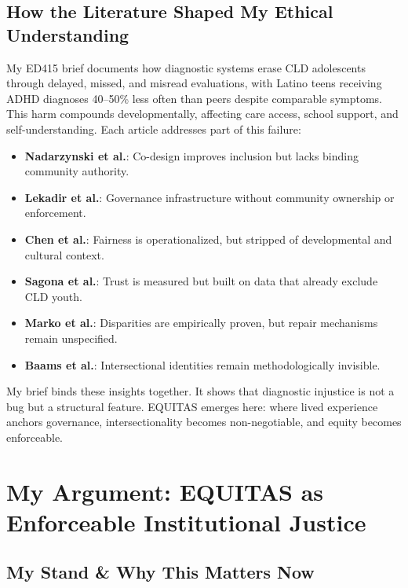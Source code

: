 \documentclass[12pt,a4paper]{article}
\begin{document}
\subsection{How the Literature Shaped My Ethical Understanding}
My ED415 brief documents how diagnostic systems erase CLD adolescents through delayed, missed, and misread evaluations, with Latino teens receiving ADHD diagnoses 40–50\% less often than peers despite comparable symptoms. This harm compounds developmentally, affecting care access, school support, and self-understanding. Each article addresses part of this failure:
\begin{itemize}
    \setlength\itemsep{0.1em}
    \item \textbf{Nadarzynski et al.}: Co-design improves inclusion but lacks binding community authority.
    \item \textbf{Lekadir et al.}: Governance infrastructure without community ownership or enforcement.
    \item \textbf{Chen et al.}: Fairness is operationalized, but stripped of developmental and cultural context.
    \item \textbf{Sagona et al.}: Trust is measured but built on data that already exclude CLD youth.
    \item \textbf{Marko et al.}: Disparities are empirically proven, but repair mechanisms remain unspecified.
    \item \textbf{Baams et al.}: Intersectional identities remain methodologically invisible.
\end{itemize}

My brief binds these insights together. It shows that diagnostic injustice is not a bug but a structural feature. EQUITAS emerges here: where lived experience anchors governance, intersectionality becomes non-negotiable, and equity becomes enforceable.





\newpage
\section{My Argument: EQUITAS as Enforceable Institutional Justice}

\subsection{My Stand \texorpdfstring{\&}{and} Why This Matters Now}
\end{document}
